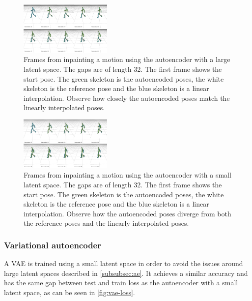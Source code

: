 \begin{figure}[H]
\centering
\includegraphics[width=0.4\textwidth]{img/ae-large-inpainting}
\caption{Frames from inpainting a motion using the autoencoder with a large latent space. The gaps are of length 32. The first frame shows the start pose. The green skeleton is the autoencoded poses, the white skeleton is the reference pose and the blue skeleton is a linear interpolation. Observe how closely the autoencoded poses match the linearly interpolated poses.}
\label{fig:ae-large-inpainting}
\end{figure}

\begin{figure}[H]
\centering
\includegraphics[width=0.4\textwidth]{img/ae-small-inpainting}
\caption{Frames from inpainting a motion using the autoencoder with a small latent space. The gaps are of length 32. The first frame shows the start pose. The green skeleton is the autoencoded poses, the white skeleton is the reference pose and the blue skeleton is a linear interpolation. Observe how the autoencoded poses diverge from both the reference poses and the linearly interpolated poses.}
\label{fig:ae-small-inpainting}
\end{figure}

\newpage






\subsubsection{Variational autoencoder}\label{subsubsec:vae}
A VAE is trained using a small latent space in order to avoid the issues around large latent spaces described in \ref{subsubsec:ae}. It achieves a similar accuracy and has the same gap between test and train loss as the autoencoder with a small latent space, as can be seen in \autoref{fig:vae-loss}.

